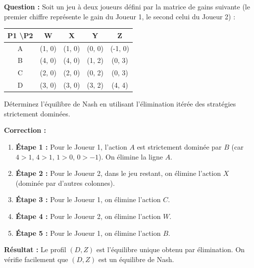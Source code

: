 \begin{exemple}
\textbf{Question :}
Soit un jeu à deux joueurs défini par la matrice de gains suivante (le premier chiffre représente le gain du Joueur 1, le second celui du Joueur 2) :

\begin{center}
\begin{tabular}{c|cccc}
P1 \textbackslash P2 & W & X & Y & Z \\ \hline
A & (1, 0) & (1, 0) & (0, 0) & (-1, 0) \\
B & (4, 0) & (4, 0) & (1, 2) & (0, 3) \\
C & (2, 0) & (2, 0) & (0, 2) & (0, 3) \\
D & (3, 0) & (3, 0) & (3, 2) & (4, 4)
\end{tabular}
\end{center}

Déterminez l'équilibre de Nash en utilisant l'élimination itérée des stratégies strictement dominées.

\textbf{Correction :}
\begin{enumerate}
    \item \textbf{Étape 1 :} Pour le Joueur 1, l'action $A$ est strictement dominée par $B$ (car $4 > 1$, $4 > 1$, $1 > 0$, $0 > -1$). On élimine la ligne $A$.
    \item \textbf{Étape 2 :} Pour le Joueur 2, dans le jeu restant, on élimine l'action $X$ (dominée par d'autres colonnes).
    \item \textbf{Étape 3 :} Pour le Joueur 1, on élimine l'action $C$.
    \item \textbf{Étape 4 :} Pour le Joueur 2, on élimine l'action $W$.
    \item \textbf{Étape 5 :} Pour le Joueur 1, on élimine l'action $B$.
\end{enumerate}
\textbf{Résultat :} Le profil $(D, Z)$ est l'équilibre unique obtenu par élimination. On vérifie facilement que $(D, Z)$ est un équilibre de Nash.

\end{exemple}

